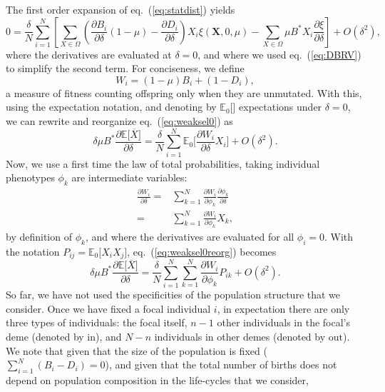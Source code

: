 \documentclass[11pt, letterpaper]{article}
\renewcommand{\eqref}[1]{\textup{{\normalfont eq.~(\ref{#1}}\normalfont)}}
\newcommand{\derivn}[2]{\frac{\partial #1}{\partial #2}}
\newcommand{\Esp}[1]{\mathbb{E}\big[ #1\big]}%
\newcommand{\Espzero}[1]{\mathbb{E}_0\big[ #1\big]}%
\newcommand{\bigO}[1]{O\left( #1 \right)}
\newcommand{\inn}{\textrm{in}}
\newcommand{\out}{\textrm{out}}
\newcommand{\selstr}{\delta}
\begin{document}
The first order expansion of \eqref{eq:statdist} yields
%
\begin{equation}\label{eq:weaksel0}
0 = \frac{\selstr}{N} \sum_{i=1}^N \left[ \sum_{X\in \Omega} \left( \derivn{B_i}{\selstr} (1-\mu) - \derivn{D_i}{\selstr} \right) X_i  \xi(\mathbf{X}, 0, \mu) - \sum_{X\in \Omega} \mu B^* X_i  \derivn{\xi}{\selstr}\right]  + \bigO{\selstr^2},
\end{equation}
%
where the derivatives are evaluated at $\selstr = 0$, and where we used \eqref{eq:DBRV} to simplify the second term. For conciseness, we define 
%
\begin{equation}\label{eq:app:defW}
W_i = (1-\mu) B_i + (1-D_i), 
\end{equation}
%
a measure of fitness counting offspring only when they are unmutated. With this, using the expectation notation, and denoting by $\Espzero{}$ expectations under $\selstr = 0$, we can rewrite and reorganize \eqref{eq:weaksel0} as
%
\begin{equation}\label{eq:weaksel0reorg}
\selstr \mu B^* \derivn{\Esp{\overline{X}}}{\selstr} = \frac{\selstr}{N} \sum_{i=1}^N \Espzero{ \derivn{W_i}{\selstr} X_i } + \bigO{\selstr^2}.
\end{equation}
%
Now, we use a first time the law of total probabilities, taking individual phenotypes $\phi_k$ are intermediate variables:
%
\begin{align}
\derivn{W_i}{\selstr} =& \sum_{k=1}^N \derivn{W_i}{\phi_k} \derivn{\phi_k}{\selstr} \nonumber \\
=& \sum_{k=1}^N \derivn{W_i}{\phi_k} X_k,
\label{eq:totalproba1}
\end{align}
%
by definition of $\phi_k$, and where the derivatives are evaluated for all $\phi_i = 0$. With the notation $P_{ij} = \Espzero{X_i X_j}$, \eqref{eq:weaksel0reorg} becomes
%
\begin{equation}\label{eq:weaksel1}
\selstr \mu B^* \derivn{\Esp{\overline{X}}}{\selstr} = \frac{\selstr}{N} \sum_{i=1}^N \sum_{k=1}^N \derivn{W_i}{\phi_k} P_{ik} + \bigO{\selstr^2}.
\end{equation}
%
So far, we have not used the specificities of the population structure that we consider. Once we have fixed a focal individual $i$, in expectation there are only three types of individuals: the focal itself, $n-1$ other individuals in the focal's deme (denoted by $\inn$), and $N - n$ individuals in other demes (denoted by $\out$). We note that given that the size of the population is fixed ($\sum_{i=1}^N (B_i-D_i)=0$), and given that the total number of births does not depend on population composition in the life-cycles that we consider, 
\end{document}
